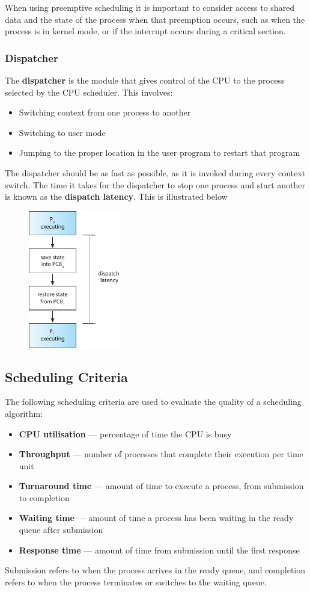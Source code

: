 \documentclass{article}
\begin{document}
When using preemptive scheduling it is important to consider access to
shared data and the state of the process when that preemption occurs,
such as when the process is in kernel mode, or if the interrupt occurs
during a critical section.
\subsubsection{Dispatcher}
The \textbf{dispatcher} is the module that gives control of the CPU to
the process selected by the CPU scheduler. This involves:
\begin{itemize}
    \item Switching context from one process to another
    \item Switching to user mode
    \item Jumping to the proper location in the user program to restart
          that program
\end{itemize}
The dispatcher should be as fast as possible, as it is invoked during
every context switch. The time it takes for the dispatcher to stop one
process and start another is known as the \textbf{dispatch latency}.
This is illustrated below
\begin{figure}[H]
    \centering
    \includegraphics[height = 6cm]{figures/dispatcher.pdf}
\end{figure}
\subsection{Scheduling Criteria}
The following scheduling criteria are used to evaluate the quality of a
scheduling algorithm:
\begin{itemize}
    \item \textbf{CPU utilisation} --- percentage of time the CPU is
          busy
    \item \textbf{Throughput} --- number of processes that complete
          their execution per time unit
    \item \textbf{Turnaround time} --- amount of time to execute a
          process, from submission to completion
    \item \textbf{Waiting time} --- amount of time a process has been
          waiting in the ready queue after submission
    \item \textbf{Response time} --- amount of time from submission
          until the first response
\end{itemize}
Submission refers to when the process arrives in the ready queue, and
completion refers to when the process terminates or switches to the
waiting queue.
\end{document}
